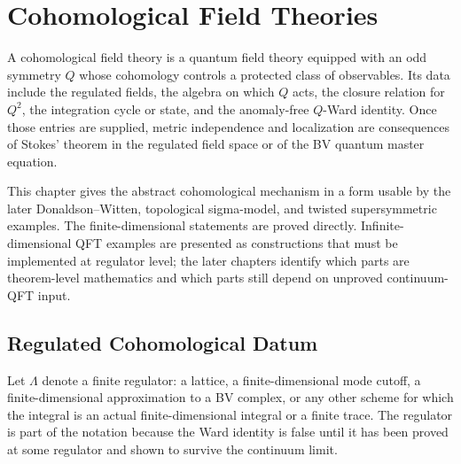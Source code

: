 \chapter{Cohomological Field Theories}
\label{ch:tqft-cohomological-field-theories}

\ConventionsEuclidean

A cohomological field theory is a quantum field theory equipped with an odd
symmetry \(Q\) whose cohomology controls a protected class of observables.
Its data include the regulated fields, the algebra on which \(Q\) acts, the
closure relation for \(Q^2\), the integration cycle or state, and the
anomaly-free \(Q\)-Ward identity.  Once those entries are supplied, metric
independence and localization are consequences of Stokes' theorem in the
regulated field space or of the BV quantum master equation.

This chapter gives the abstract cohomological mechanism in a form usable by
the later Donaldson--Witten, topological sigma-model, and twisted
supersymmetric examples.  The finite-dimensional statements are proved
directly.  Infinite-dimensional QFT examples are presented as constructions
that must be implemented at regulator level; the later chapters identify
which parts are theorem-level mathematics and which parts still depend on
unproved continuum-QFT input.

\section{Regulated Cohomological Datum}

Let \(\Lambda\) denote a finite regulator: a lattice, a finite-dimensional
mode cutoff, a finite-dimensional approximation to a BV complex, or any other
scheme for which the integral is an actual finite-dimensional integral or a
finite trace.  The regulator is part of the notation because the Ward
identity is false until it has been proved at some regulator and shown to
survive the continuum limit.

